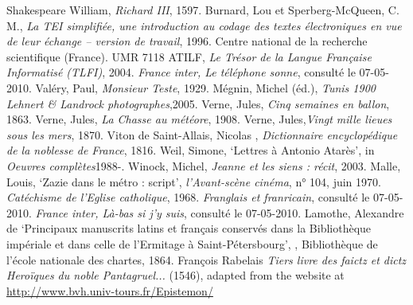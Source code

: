 \begin{bibitemlist}{1}
 Shakespeare William, \textit{Richard III}, 1597.
 Burnard, Lou et Sperberg-McQueen, C. M., \textit{La TEI simplifiée, une introduction au codage des textes électroniques en vue de leur échange -- version de travail}, 1996.
 Centre national de la recherche scientifique (France). UMR 7118 ATILF, \textit{Le Trésor de la Langue Française Informatisé (TLFI)}, 2004.
 \textit{France inter, Le téléphone sonne}, consulté le 07-05-2010.
 Valéry, Paul, \textit{Monsieur Teste}, 1929.
 Mégnin, Michel (éd.), \textit{Tunis 1900 Lehnert \& Landrock photographes},2005.
 Verne, Jules, \textit{Cinq semaines en ballon}, 1863.
 Verne, Jules, \textit{La Chasse au météore}, 1908.
 Verne, Jules,\textit{Vingt mille lieues sous les mers}, 1870.
 Viton de Saint-Allais, Nicolas , \textit{Dictionnaire encyclopédique de la noblesse de France}, 1816.
 Weil, Simone, ‘Lettres à Antonio Atarès’, in \textit{Oeuvres complètes}1988-.
 Winock, Michel, \textit{Jeanne et les siens : récit}, 2003.
 Malle, Louis, ‘Zazie dans le métro : script’, \textit{l'Avant-scène cinéma}, n° 104, juin 1970.
 \textit{Catéchisme de l'Eglise catholique}, 1968.
 \textit{Franglais et franricain}, consulté le 07-05-2010.
 \textit{France inter, Là-bas si j'y suis}, consulté le 07-05-2010.
 Lamothe, Alexandre de ‘Principaux manuscrits latins et français conservés dans la Bibliothèque impériale et dans celle de l'Ermitage à Saint-Pétersbourg’, , Bibliothèque de l'école nationale des chartes, 1864.
 François Rabelais \textit{Tiers livre des faictz et dictz Heroïques du noble Pantagruel...} (1546), adapted from the website at \url{http://www.bvh.univ-tours.fr/Epistemon/}

\end{bibitemlist}
